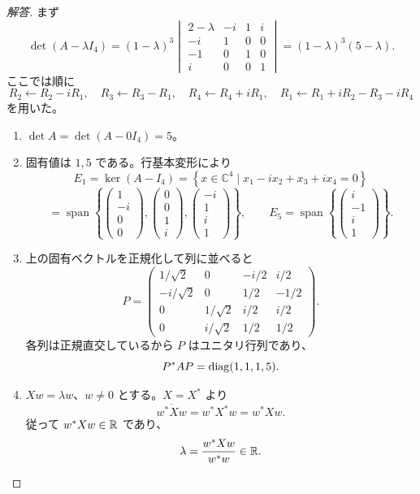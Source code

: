 \begin{proof}[解答]
まず
\[
\det(A-\lambda I_4)
=(1-\lambda)^3
\begin{vmatrix}
2-\lambda&-i&1&i\\
-i&1&0&0\\
-1&0&1&0\\
i&0&0&1
\end{vmatrix}
=(1-\lambda)^3(5-\lambda).
\]
ここでは順に
\[
R_2\leftarrow R_2-iR_1,\quad
R_3\leftarrow R_3-R_1,\quad
R_4\leftarrow R_4+iR_1,\quad
R_1\leftarrow R_1+iR_2-R_3-iR_4
\]
を用いた。
\begin{enumerate}
  \item[(1)] $\det A=\det(A-0I_4)=5$。

  \item[(2)] 固有値は $1,5$ である。行基本変形により
  \[
  E_1=\ker(A-I_4)
  =\left\{x\in\mathbb C^4\mid x_1-ix_2+x_3+ix_4=0\right\}
  \]
  \[
  =\operatorname{span}\left\{
  \begin{pmatrix}1\\-i\\0\\0\end{pmatrix},
  \begin{pmatrix}0\\0\\1\\i\end{pmatrix},
  \begin{pmatrix}-i\\1\\i\\1\end{pmatrix}
  \right\},
  \qquad
  E_5=\operatorname{span}\left\{\begin{pmatrix}i\\-1\\i\\1\end{pmatrix}\right\}.
  \]

  \item[(3)] 上の固有ベクトルを正規化して列に並べると
  \[
  P=\begin{pmatrix}
  1/\sqrt2&0&-i/2&i/2\\
  -i/\sqrt2&0&1/2&-1/2\\
  0&1/\sqrt2&i/2&i/2\\
  0&i/\sqrt2&1/2&1/2
  \end{pmatrix}.
  \]
  各列は正規直交しているから $P$ はユニタリ行列であり、
  \[
  P^*AP=\operatorname{diag}(1,1,1,5).
  \]

  \item[(4)] $Xw=\lambda w$、$w\ne0$ とする。$X=X^*$ より
  \[
  \overline{w^*Xw}=w^*X^*w=w^*Xw.
  \]
  従って $w^*Xw\in\mathbb{R}$ であり、
  \[
  \lambda=\frac{w^*Xw}{w^*w}\in\mathbb{R}.
  \]
\end{enumerate}
\end{proof}

